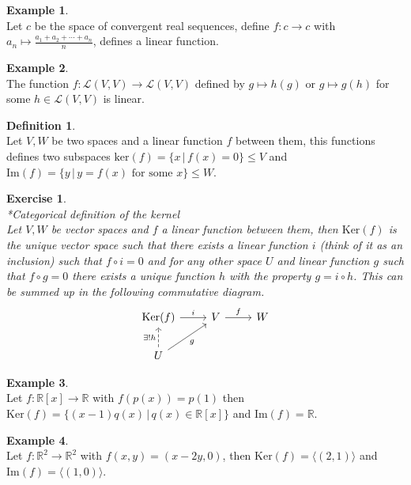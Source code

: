 \documentclass[12pt]{article}
\newcommand{\double}{\hspace{2pt}}
\theoremstyle{definition}
\newtheorem{definition}[theorem]{Definition}
\newtheorem*{example}{Example}
\theoremstyle{remark}
\theoremstyle{plain}
\newtheorem{ex}[subsubsection]{Exercise}
\begin{document}
\begin{example}\leavevmode \\
    Let $c$ be the space of convergent real sequences, define $f:c\to c$ with $a_n \mapsto \frac{a_1+a_2+\cdots+a_n}{n}$, defines a linear function.
\end{example}
\begin{example}\leavevmode \\
    The function $f:\mathcal{L}(V,V)\to \mathcal{L}(V,V)$ defined by $g\mapsto h(g)$ or $g\mapsto g(h)$ for some $h \in \mathcal{L}(V,V)$ is linear.
\end{example}
\begin{definition}\leavevmode \\
    Let $V,W$ be two spaces and a linear function $f$ between them, this functions defines two subspaces $\mathrm{ker}(f)=\{x\double | \double f(x)=0 \}\leq V$ and $\mathrm{Im}(f)=\{y \double | \double y=f(x) \text{ for some }x \}\leq W$.
\end{definition}
\begin{ex}\leavevmode \\*\textup{Categorical definition of the kernel}\\
Let $V,W$ be vector spaces and $f$ a linear function between them, then $\mathrm{Ker}(f)$ is the unique vector space such that there exists a linear function $i$ (think of it as an inclusion) such that  $f\circ i=0$ and for any other space $U$ and linear function $g$ such that $f \circ g=0$ there exists a unique function $h$ with the property $g=i\circ h$. This can be summed up in the following commutative diagram.
\[\begin{tikzcd}
	{\mathrm{Ker}(f)} & V & W \\
	U
	\arrow["i", from=1-1, to=1-2]
	\arrow["f", from=1-2, to=1-3]
	\arrow["{\exists !h}", dashed, from=2-1, to=1-1]
	\arrow["g"', from=2-1, to=1-2]
\end{tikzcd}\]
    
\end{ex}
\begin{example}\leavevmode \\
Let $f:\mathbb{R}[x]\to \mathbb{R}$ with $f(p(x))=p(1)$ then $\mathrm{Ker}(f)=\{ (x-1)q(x) \double | \double q(x)\in \mathbb{R}[x] \}$ and $\mathrm{Im}(f)=\mathbb{R}$.
\end{example}
\begin{example}\leavevmode \\
Let $f:\mathbb{R}^2\to \mathbb{R}^2$ with $f(x,y)=(x-2y,0)$, then $\mathrm{Ker}(f)=\langle (2,1)\rangle$ and $\mathrm{Im}(f)=\langle (1,0)\rangle$.
\end{example}
\end{document}
